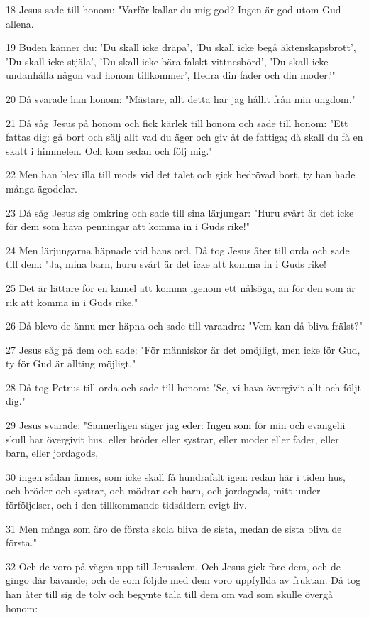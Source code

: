 \par 18 Jesus sade till honom: "Varför kallar du mig god? Ingen är god utom Gud allena.
\par 19 Buden känner du: 'Du skall icke dräpa', 'Du skall icke begå äktenskapsbrott', 'Du skall icke stjäla', 'Du skall icke bära falskt vittnesbörd', 'Du skall icke undanhålla någon vad honom tillkommer', Hedra din fader och din moder.'"
\par 20 Då svarade han honom: "Mästare, allt detta har jag hållit från min ungdom."
\par 21 Då såg Jesus på honom och fick kärlek till honom och sade till honom: "Ett fattas dig: gå bort och sälj allt vad du äger och giv åt de fattiga; då skall du få en skatt i himmelen. Och kom sedan och följ mig."
\par 22 Men han blev illa till mods vid det talet och gick bedrövad bort, ty han hade många ägodelar.
\par 23 Då såg Jesus sig omkring och sade till sina lärjungar: "Huru svårt är det icke för dem som hava penningar att komma in i Guds rike!"
\par 24 Men lärjungarna häpnade vid hans ord. Då tog Jesus åter till orda och sade till dem: "Ja, mina barn, huru svårt är det icke att komma in i Guds rike!
\par 25 Det är lättare för en kamel att komma igenom ett nålsöga, än för den som är rik att komma in i Guds rike."
\par 26 Då blevo de ännu mer häpna och sade till varandra: "Vem kan då bliva frälst?"
\par 27 Jesus såg på dem och sade: "För människor är det omöjligt, men icke för Gud, ty för Gud är allting möjligt."
\par 28 Då tog Petrus till orda och sade till honom: "Se, vi hava övergivit allt och följt dig."
\par 29 Jesus svarade: "Sannerligen säger jag eder: Ingen som för min och evangelii skull har övergivit hus, eller bröder eller systrar, eller moder eller fader, eller barn, eller jordagods,
\par 30 ingen sådan finnes, som icke skall få hundrafalt igen: redan här i tiden hus, och bröder och systrar, och mödrar och barn, och jordagods, mitt under förföljelser, och i den tillkommande tidsåldern evigt liv.
\par 31 Men många som äro de första skola bliva de sista, medan de sista bliva de första."
\par 32 Och de voro på vägen upp till Jerusalem. Och Jesus gick före dem, och de gingo där bävande; och de som följde med dem voro uppfyllda av fruktan. Då tog han åter till sig de tolv och begynte tala till dem om vad som skulle övergå honom:
